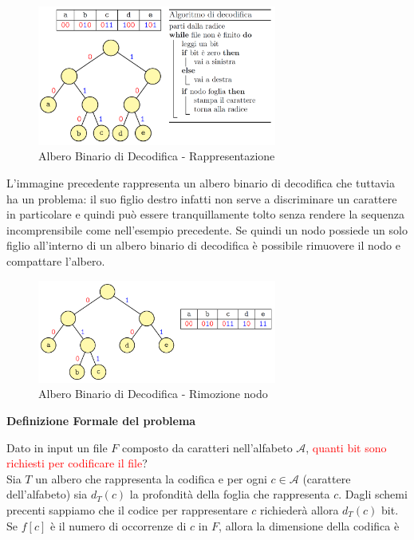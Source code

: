 \documentclass[../cheatSheetAlgoritmi.tex]{subfiles}
\begin{document}
\begin{figure}[h]
	\centering
	\includegraphics[width=0.7\textwidth]{../img/Greedy_2.png}
	\caption{Albero Binario di Decodifica - Rappresentazione}
\end{figure}
L'immagine precedente rappresenta un albero binario di decodifica che tuttavia ha un problema: il suo figlio destro infatti non serve a discriminare un carattere in particolare e quindi può essere tranquillamente tolto senza rendere la sequenza incomprensibile come nell'esempio precedente. Se quindi un nodo possiede un solo figlio all'interno di un albero binario di decodifica è possibile rimuovere il nodo e compattare l'albero.\\
\begin{figure}[h]
\centering
\includegraphics[width=0.7\textwidth]{../img/Greedy_3.png}
\caption{Albero Binario di Decodifica - Rimozione nodo}
\end{figure}
\newpage
\begin{flushleft}
\textbf{Definizione Formale del problema}
\end{flushleft}
Dato in input un file $F$ composto da caratteri nell'alfabeto $\mathcal{A}$, \textcolor{red}{quanti bit sono richiesti per codificare il file}?\\
Sia $T$ un albero che rappresenta la codifica e per ogni $c \in \mathcal{A}$ (carattere dell'alfabeto) sia $d_{T}(c)$ la profondità della foglia che rappresenta $c$. Dagli schemi precenti sappiamo che il codice per rappresentare $c$ richiederà allora $d_{T}(c)$ bit. Se $f[c]$ è il numero di occorrenze di $c$ in $F$, allora la dimensione della codifica è
\end{document}
